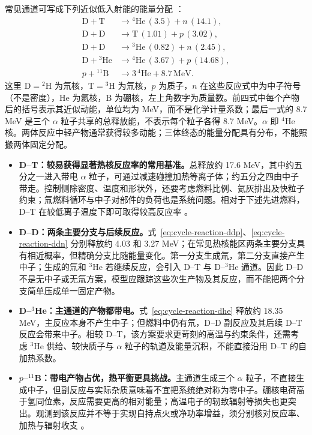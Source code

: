 \documentclass[12pt,fontset=none]{ctexart}
\numberwithin{equation}{section}
\numberwithin{table}{section}
\numberwithin{figure}{section}
\begin{document}
常见通道可写成下列近似低入射能的能量分配 \cite{C10,C12}：
\begin{align}
 \mathrm D+\mathrm T&\longrightarrow{}^4\mathrm{He}\,(3.5)+n\,(14.1),\label{eq:cycle-reaction-dt}\\
 \mathrm D+\mathrm D&\longrightarrow\mathrm T\,(1.01)+p\,(3.02),\label{eq:cycle-reaction-ddp}\\
 \mathrm D+\mathrm D&\longrightarrow{}^3\mathrm{He}\,(0.82)+n\,(2.45),\label{eq:cycle-reaction-ddn}\\
 \mathrm D+{}^3\mathrm{He}&\longrightarrow{}^4\mathrm{He}\,(3.67)+p\,(14.68),\label{eq:cycle-reaction-dhe}\\
 p+{}^{11}\mathrm B&\longrightarrow3\,{}^4\mathrm{He}+8.7\,\mathrm{MeV}.\label{eq:cycle-reaction-pb}
\end{align}
这里 $\mathrm D={}^2\mathrm H$ 为氘核，$\mathrm T={}^3\mathrm H$ 为氚核，$p$ 为质子，$n$ 在这些反应式中为中子符号（不是密度），$\mathrm{He}$ 为氦核，$\mathrm B$ 为硼核，左上角数字为质量数。前四式中每个产物后的括号表示其近似动能，单位均为 MeV，而不是化学计量系数；最后一式的 8.7 MeV 是三个 $\alpha$ 粒子共享的总释放能，不表示每个粒子各得 8.7 MeV。$\alpha$ 即 ${}^4\mathrm{He}$ 核。两体反应中轻产物通常获得较多动能；三体终态的能量分配具有分布，不能照搬两体固定分配。

\begin{itemize}[itemsep=0.35em]
 \item \textbf{D--T：较易获得显著热核反应率的常用基准。}总释放约 17.6 MeV，其中约五分之一进入带电 $\alpha$ 粒子，可通过减速碰撞加热等离子体；约五分之四由中子带走。控制侧除密度、温度和形状外，还要考虑燃料比例、氦灰排出及快粒子约束；氚燃料循环与中子对部件的负荷也是系统问题。相对于下述先进燃料，D--T 在较低离子温度下即可取得较高反应率 \cite{C11}。
 \item \textbf{D--D：两条主要分支与后续反应。}式~\eqref{eq:cycle-reaction-ddp}、\eqref{eq:cycle-reaction-ddn} 分别释放约 4.03 和 3.27 MeV；在常见热核能区两条主要分支具有相近概率，但精确分支比随能量变化。第一分支生成氚，第二分支直接产生中子；生成的氚和 ${}^3\mathrm{He}$ 若继续反应，会引入 D--T 与 D--${}^3$He 通道。因此 D--D 不是无中子或无氚方案，模型应跟踪这些次生产物及其反应，而不能把两个分支简单压成单一固定产物。
 \item \textbf{D--${}^3$He：主通道的产物都带电。}式~\eqref{eq:cycle-reaction-dhe} 释放约 18.35 MeV，主反应本身不产生中子；但燃料中仍有氘，D--D 副反应及其后续 D--T 反应会带来中子。相较 D--T，该方案要求更苛刻的高温与约束条件，还需考虑 ${}^3\mathrm{He}$ 供给、较快质子与 $\alpha$ 粒子的轨道及能量沉积，不能直接沿用 D--T 的自加热系数。
 \item \textbf{$p$--${}^{11}$B：带电产物占优，热平衡更具挑战。}主通道生成三个 $\alpha$ 粒子，不直接生成中子，但副反应与实际杂质意味着不宜把系统绝对称为零中子。硼核电荷高于氢同位素，反应需要更高的相对能量；高温电子的轫致辐射等损失也更突出。观测到该反应并不等于实现自持点火或净功率增益，须分别核对反应率、加热与辐射收支 \cite{C12}。
\end{itemize}
\end{document}
